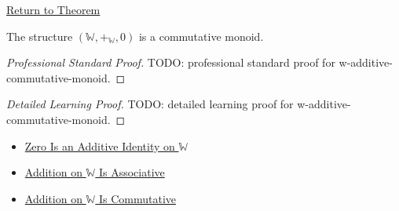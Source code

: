\newpage
{}
\label{prf:w-additive-commutative-monoid}

\begin{remark*}[Return]
\hyperref[thm:w-additive-commutative-monoid]{Return to Theorem}
\end{remark*}

\begin{theorem*}
The structure $(\mathbb{W},+_{\mathbb{W}},0)$ is a commutative monoid.
\end{theorem*}

\begin{proof}[Professional Standard Proof]
\LRAProofBodyStart
TODO: professional standard proof for w-additive-commutative-monoid.
\end{proof}

\begin{proof}[Detailed Learning Proof]
\LRAProofBodyStart
TODO: detailed learning proof for w-additive-commutative-monoid.
\end{proof}

\begin{remark*}
\end{remark*}

\begin{dependencies}
\begin{itemize}
  \item \hyperref[thm:zero-additive-identity-on-w]{Zero Is an Additive Identity on $\mathbb{W}$}
  \item \hyperref[thm:addition-on-w-associative]{Addition on $\mathbb{W}$ Is Associative}
  \item \hyperref[thm:addition-on-w-commutative]{Addition on $\mathbb{W}$ Is Commutative}
\end{itemize}
\end{dependencies}

\clearpage
